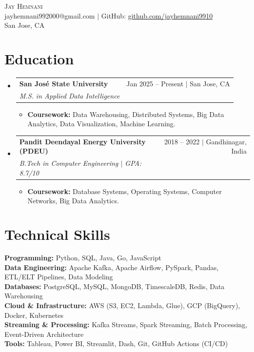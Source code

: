 \documentclass[letterpaper,10pt]{article}
\makeatletter
\newcommand{\resumeItem}[1]{
  \item\small{#1 \vspace{-3pt}}
}
\newcommand{\resumeSubheading}[4]{
  \vspace{-3pt}\item
    \begin{tabular*}{0.97\textwidth}[t]{l@{\extracolsep{\fill}}r}
      \textbf{#1} & #2 \\
      \textit{\small#3} & \textit{\small #4} \\
    \end{tabular*}\vspace{-8pt}
}
\newcommand{\resumeSubHeadingListStart}{\begin{itemize}[leftmargin=0.12in, label={}]}
\newcommand{\resumeSubHeadingListEnd}{\end{itemize}}
\newcommand{\resumeItemListStart}{\begin{itemize}[leftmargin=0.15in]}
\newcommand{\resumeItemListEnd}{\end{itemize}\vspace{-6pt}}
\makeatother
\begin{document}
\begin{center}
    {\Huge \scshape Jay Hemnani} \\ \vspace{2pt}
    \small jayhemnani992000@gmail.com $|$ GitHub: \href{https://github.com/jayhemnani9910}{github.com/jayhemnani9910} \\
    San Jose, CA
\end{center}

\section{Education}
  \resumeSubHeadingListStart
    \resumeSubheading
      {San Jos\'{e} State University}{Jan 2025 -- Present $|$ San Jose, CA}
      {M.S. in Applied Data Intelligence}{}
      \resumeItemListStart
        \resumeItem{\textbf{Coursework:} Data Warehousing, Distributed Systems, Big Data Analytics, Data Visualization, Machine Learning.}
      \resumeItemListEnd
    \resumeSubheading
      {Pandit Deendayal Energy University (PDEU)}{2018 -- 2022 $|$ Gandhinagar, India}
      {B.Tech in Computer Engineering $|$ GPA: 8.7/10}{}
      \resumeItemListStart
        \resumeItem{\textbf{Coursework:} Database Systems, Operating Systems, Computer Networks, Big Data Analytics.}
      \resumeItemListEnd
  \resumeSubHeadingListEnd

\section{Technical Skills}
 \begin{itemize}[leftmargin=0.12in, label={}]
    \small{\item{
     \textbf{Programming:} Python, SQL, Java, Go, JavaScript \\
     \textbf{Data Engineering:} Apache Kafka, Apache Airflow, PySpark, Pandas, ETL/ELT Pipelines, Data Modeling \\
     \textbf{Databases:} PostgreSQL, MySQL, MongoDB, TimescaleDB, Redis, Data Warehousing \\
     \textbf{Cloud \& Infrastructure:} AWS (S3, EC2, Lambda, Glue), GCP (BigQuery), Docker, Kubernetes \\
     \textbf{Streaming \& Processing:} Kafka Streams, Spark Streaming, Batch Processing, Event-Driven Architecture \\
     \textbf{Tools:} Tableau, Power BI, Streamlit, Dash, Git, GitHub Actions (CI/CD)
    }}
 \end{itemize}
 \vspace{-8pt}
\end{document}
